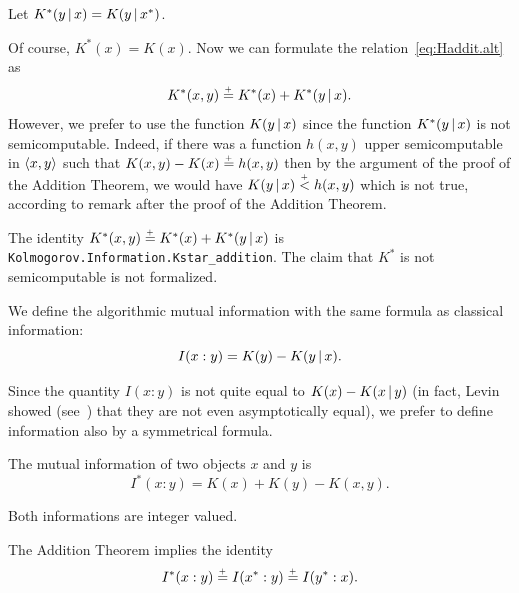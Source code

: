  \begin{definition}
  \label{def:g3.1.7}
  \leanok
Let \( K^{*}(y \,\vert\, x) = K(y \,\vert\, x^{*}) \).
 \end{definition}

Of course, \( K^{*}(x) = K(x) \).
Now we can formulate the relation~\eqref{eq:Haddit.alt} as
 \[	K^{*}(x, y) \stackrel{{}_+}{=} K^{*}(x) + K^{*}(y \,\vert\, x).
 \]
  However, we prefer to use the function \( K(y \,\vert\, x) \) since the
function \( K^{*}(y \,\vert\, x) \) is not semicomputable.
Indeed, if there was
a function \( h(x,y) \) upper semicomputable in \( {\mathopen\langle  x,y\mathclose\rangle} \) such that
\( K(x,y) - K(x) \stackrel{{}_+}{=} h(x,y) \) then by the argument of the proof of the
Addition Theorem, we would have \( K(y \,\vert\, x) \stackrel{{}_+}{<} h(x,y) \) which is not
true, according to remark after the proof of the Addition Theorem.

\begin{formalization}
The identity \( K^{*}(x, y) \stackrel{{}_+}{=} K^{*}(x) + K^{*}(y \,\vert\, x) \) is
\texttt{Kolmogorov.Information.Kstar\_addition}. The claim that \( K^{*} \) is not
semicomputable is not formalized.
\end{formalization}

\begin{definition}
  \label{def:g3.1.8}
  \leanok
We define the algorithmic mutual information with the same formula as classical
information:
 \[
   I(x : y) = K(y) - K(y \,\vert\, x).
 \]
\end{definition}

Since the quantity \(  I(x : y) \) is not quite equal to
\( K(x) - K(x \,\vert\, y) \) (in fact, Levin showed (see~\cite{GacsSymm74}) that
they are not even asymptotically equal), we prefer to define information also by a
symmetrical formula.

 \begin{definition}\label{def:I*}
  \leanok
The mutual information of two objects \( x \) and \( y \) is
 \[
	I^{*}(x : y) = K(x) + K(y) - K(x, y).
 \]
 \end{definition}

\begin{formalization}
Both informations are integer valued.
\end{formalization}

The Addition Theorem implies the identity
 \[
 	I^{*}(x : y) \stackrel{{}_+}{=} I(x^{*} : y) \stackrel{{}_+}{=} I(y^{*} : x).
 \]


